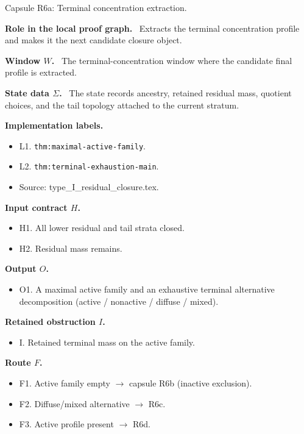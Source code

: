 \documentclass[11pt]{amsart}
\newcommand{\capsulefield}[1]{\par\smallskip\noindent\textbf{#1.}\ }
\begin{document}
\begin{proofcapsule}{Capsule R6a: Terminal concentration extraction.}
  \capsulefield{Role in the local proof graph}
  Extracts the terminal concentration profile and makes it the next candidate closure object.

  \capsulefield{Window \(W\)}
The terminal-concentration window where the candidate final profile is extracted.

  \capsulefield{State data \(\Sigma\)}
The state records ancestry, retained residual mass, quotient choices, and the tail topology attached to the current stratum.

  \capsulefield{Implementation labels}
  \begin{itemize}[leftmargin=1.8em]
  \item L1. \texttt{thm:maximal-active-family}.
  \item L2. \texttt{thm:terminal-exhaustion-main}.
  \item Source: type\_I\_residual\_closure.tex.
  \end{itemize}

  \capsulefield{Input contract \(H\)}
  \begin{itemize}[leftmargin=1.8em]
  \item H1. All lower residual and tail strata closed.
  \item H2. Residual mass remains.
  \end{itemize}

  \capsulefield{Output \(O\)}
  \begin{itemize}[leftmargin=1.8em]
  \item O1. A maximal active family and an exhaustive terminal alternative decomposition (active / nonactive / diffuse / mixed).
  \end{itemize}

  \capsulefield{Retained obstruction \(I\)}
  \begin{itemize}[leftmargin=1.8em]
  \item I. Retained terminal mass on the active family.
  \end{itemize}

  \capsulefield{Route \(F\)}
  \begin{itemize}[leftmargin=1.8em]
  \item F1. Active family empty $\to$ capsule R6b (inactive exclusion).
  \item F2. Diffuse/mixed alternative $\to$ R6c.
  \item F3. Active profile present $\to$ R6d.
  \end{itemize}


\end{proofcapsule}
\end{document}
